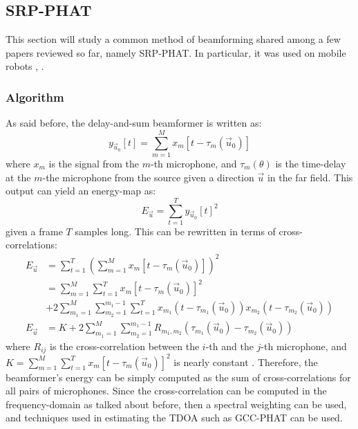 \documentclass{report}
\begin{document}
\subsection{SRP-PHAT}

This section will study a common method of beamforming shared among a few papers reviewed so far, namely SRP-PHAT. In particular, it was used on mobile robots \cite{valin_localization_2004}, \cite{valin_robust_2007}.

\subsubsection{Algorithm}

As said before, the delay-and-sum beamformer is written as:
\begin{equation}
y_{\vec{u}_0}[t] = \sum_{m=1}^M x_m[t-\tau_m(\vec{u}_0)] 
\end{equation}
where $x_m$ is the signal from the $m$-th microphone, and $\tau_m(\theta)$ is the time-delay at the $m$-the microphone from the source given a direction $\vec{u}$ in the far field. This output can yield an energy-map as:
\begin{equation}
E_{\vec{u}} = \sum_{t=1}^T y_{\vec{u}_0}[t]^2
\end{equation}
given a frame $T$ samples long. This can be rewritten in terms of cross-correlations:
\begin{equation}
\begin{split}
E_{\vec{u}} &= \sum_{t=1}^T \left( \sum_{m=1}^M x_m[t-\tau_m(\vec{u}_0)] \right)^2 \\
&= \sum_{m=1}^{M} \sum_{t=1}^T x_m[t - \tau_m(\vec{u}_0)]^2 \\
&+ 2 \sum_{m_1=1}^M \sum_{m_2=1}^{m_1-1} 
\sum_{t=1}^T x_{m_1}\left(t - \tau_{m_1}(\vec{u}_0)\right) x_{m_2}\left(t - \tau_{m_2}(\vec{u}_0)\right) \\
E_{\vec{u}} &= K 
+ 2 \sum_{m_1=1}^M \sum_{m_2=1}^{m_1-1} R_{m_1,m_2} (\tau_{m_1}(\vec{u}_0) - \tau_{m_2}(\vec{u}_0))
\end{split}
\end{equation}
where $R_{ij}$ is the cross-correlation between the $i$-th and the $j$-th microphone, and $K = \sum_{m=1}^{M} \sum_{t=1}^T x_m[t - \tau_m(\vec{u}_0)]^2$ is nearly constant \cite{valin_localization_2004} \cite{valin_robust_2007}. Therefore, the beamformer's energy can be simply computed as the sum of cross-correlations for all pairs of microphones. Since the cross-correlation can be computed in the frequency-domain as talked about before, then a spectral weighting can be used, and techniques used in estimating the TDOA such as GCC-PHAT can be used.
\end{document}
